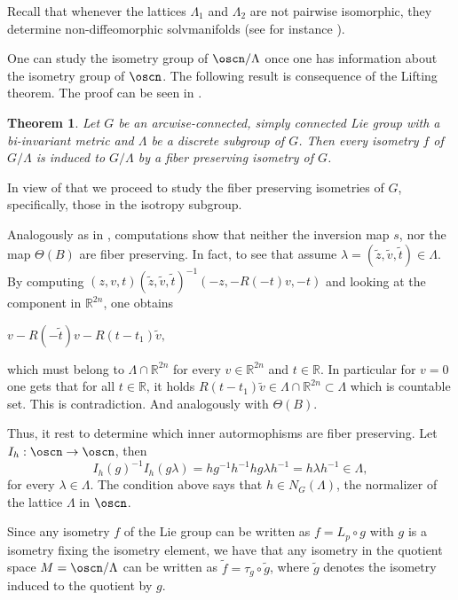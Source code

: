 \documentclass[11pt]{amsart}
\theoremstyle{plain}
\newtheorem{thm}{Theorem}[section]
\theoremstyle{definition}
\theoremstyle{remark}
\begin{document}
Recall that whenever the lattices $\Lambda_1$ and $\Lambda_2$ are not pairwise isomorphic, they determine non-diffeomorphic solvmanifolds (see for instance \cite{Ra}).

One can study the isometry group of $\oscn/\Lambda$ once one has information about the isometry group of $\oscn$. The following result is consequence of the Lifting theorem. The proof can be seen in \cite{BOV}.

\begin{thm} Let $G$ be an arcwise-connected, simply connected Lie group with a bi-invariant metric and $\Lambda$ be a discrete subgroup
of $G$. Then every isometry $f$ of $G/\Lambda$ is induced to $G/\Lambda$ by a fiber preserving isometry of $G$.
\end{thm}

In view of that we proceed to study the fiber preserving isometries of $G$, specifically, those in the isotropy subgroup.  


Analogously as in \cite{BOV}, computations show that neither the inversion map $s$, nor the map $\Theta(B)$ are fiber preserving.
In fact, to see that assume $\lambda=(\tilde{z},\tilde{v},\tilde{t})\in \Lambda$.  By computing 
		$(z,v,t)(\tilde{z},\tilde{v},\tilde{t})^{-1}(-z,-R(-t)v,-t)$ and looking at the component in $\mathbb R^{2n}$, one obtains 
				
		$v-R(-\tilde{t})v-R(t-t_1)\tilde{v},$ 
		
		which must belong to $\Lambda\cap \mathbb R^{2n}$ for every $v\in  \mathbb R^{2n}$ and $t\in \mathbb R$. In particular for $v=0$ one gets that for all $t\in \mathbb R$, it holds $R(t-t_1)\tilde{v}\in \Lambda\cap \mathbb R^{2n} \subset \Lambda$ which is countable set. This is contradiction. And analogously with $\Theta(B)$. 

Thus, it rest to determine which inner autormophisms are fiber preserving. Let $I_h: \oscn \to \oscn$, then
$$I_h(g)^{-1}I_h(g\lambda)=hg^{-1}h^{-1} hg\lambda h^{-1}= h\lambda h^{-1}\in\Lambda,$$ for every $\lambda\in \Lambda$. The condition above says that  
  $h \in N_G(\Lambda)$, the normalizer of the lattice $\Lambda$ in $\oscn$. 

Since any isometry $f$ of the Lie group can be written as $f=L_p\circ g$ with $g$ is a isometry fixing the isometry element, we have that any isometry in the quotient space $M=\oscn/\Lambda$ can be written as $\tilde{f}=\tau_g\circ \tilde{g}$, where $\tilde{g}$ denotes the isometry induced to the quotient by $g$. 
\end{document}
